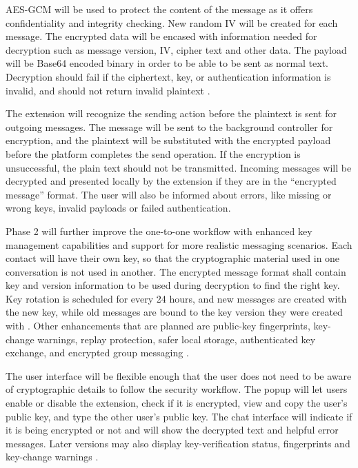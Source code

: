 \documentclass[11pt]{article}
\begin{document}
AES-GCM will be used to protect the content of the message as it offers confidentiality and integrity checking. New random IV will be created for each message. The encrypted data will be encased with information needed for decryption such as message version, IV, cipher text and other data. The payload will be Base64 encoded binary in order to be able to be sent as normal text. Decryption should fail if the ciphertext, key, or authentication information is invalid, and should not return invalid plaintext \cite{cfe2024}.

The extension will recognize the sending action before the plaintext is sent for outgoing messages. The message will be sent to the background controller for encryption, and the plaintext will be substituted with the encrypted payload before the platform completes the send operation. If the encryption is unsuccessful, the plain text should not be transmitted. Incoming messages will be decrypted and presented locally by the extension if they are in the ``encrypted message'' format. The user will also be informed about errors, like missing or wrong keys, invalid payloads or failed authentication.

Phase 2 will further improve the one-to-one workflow with enhanced key management capabilities and support for more realistic messaging scenarios. Each contact will have their own key, so that the cryptographic material used in one conversation is not used in another. The encrypted message format shall contain key and version information to be used during decryption to find the right key. Key rotation is scheduled for every 24 hours, and new messages are created with the new key, while old messages are bound to the key version they were created with \cite{signal-double-ratchet,doubleratchet2026}. Other enhancements that are planned are public-key fingerprints, key-change warnings, replay protection, safer local storage, authenticated key exchange, and encrypted group messaging \cite{whatsapp-key-transparency,mls,groupkey2024}.

The user interface will be flexible enough that the user does not need to be aware of cryptographic details to follow the security workflow. The popup will let users enable or disable the extension, check if it is encrypted, view and copy the user's public key, and type the other user's public key. The chat interface will indicate if it is being encrypted or not and will show the decrypted text and helpful error messages. Later versions may also display key-verification status, fingerprints and key-change warnings \cite{whatsapp-key-transparency}.
\end{document}
